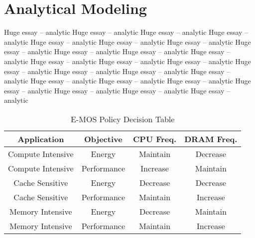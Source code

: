 \section{Analytical Modeling}\label{sec:analytic}


Huge essay -- analytic
Huge essay -- analytic
Huge essay -- analytic
Huge essay -- analytic
Huge essay -- analytic
Huge essay -- analytic
Huge essay -- analytic
Huge essay -- analytic
Huge essay -- analytic
Huge essay -- analytic
Huge essay -- analytic
Huge essay -- analytic
Huge essay -- analytic
Huge essay -- analytic
Huge essay -- analytic
Huge essay -- analytic
Huge essay -- analytic
Huge essay -- analytic
Huge essay -- analytic
Huge essay -- analytic
Huge essay -- analytic
Huge essay -- analytic
Huge essay -- analytic
Huge essay -- analytic
Huge essay -- analytic

\begin{table}[h]
\footnotesize
\def\arraystretch{0.52}
\setlength{\tabcolsep}{.30em}
\center
\begin{tabular}{cccc} \toprule
Application & Objective & CPU Freq. & DRAM Freq.  \\ \midrule
Compute Intensive & Energy & Maintain & Decrease \\
Compute Intensive & Performance & Increase & Maintain \\
Cache Sensitive & Energy &  Decrease & Decrease \\ 
Cache Sensitive & Performance &  Maintain & Increase \\ 
Memory Intensive & Energy & Decrease & Maintain \\
Memory Intensive & Performance & Maintain & Increase \\ \midrule

\end{tabular}
\caption{E-MOS Policy Decision Table}\label{tbl:emos-dec}
\end{table}


